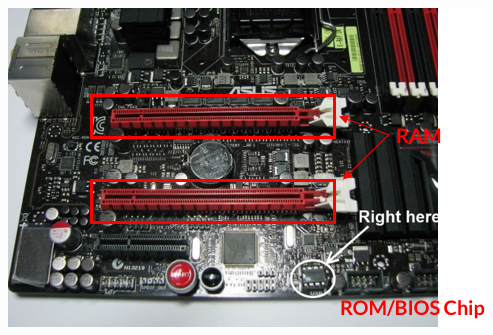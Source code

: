\documentclass[12pt]{article}
\begin{document}
\begin{itemize}
\begin{itemize}
        \begin{center}
        \includegraphics[width=0.8\linewidth]{images/week_2_notes_1_2.png}
        \end{center}

    \end{itemize}
\end{itemize}
\end{document}
